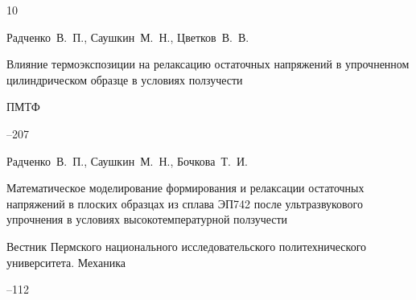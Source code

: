 \begin{thebibliography}{10}


\by Радченко~В.~П., Саушкин~М.~Н., Цветков~В.~В.

\paper Влияние термоэкспозиции на релаксацию остаточных напряжений в упрочненном цилиндрическом образце в условиях ползучести

\jour ПМТФ




--207















\by Радченко~В.~П., Саушкин~М.~Н., Бочкова~Т.~И.

\paper Математическое моделирование формирования и релаксации остаточных напряжений в плоских образцах из сплава ЭП742 после ультразвукового упрочнения в условиях высокотемпературной ползучести

\jour Вестник Пермского национального исследовательского политехнического университета. Механика



--112








\end{thebibliography}
